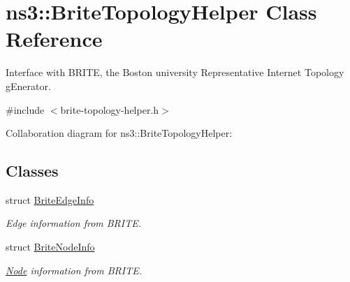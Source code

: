 \hypertarget{classns3_1_1BriteTopologyHelper}{}\section{ns3\+:\+:Brite\+Topology\+Helper Class Reference}
\label{classns3_1_1BriteTopologyHelper}


Interface with B\+R\+I\+TE, the Boston university Representative Internet Topology g\+Enerator.  




{\ttfamily \#include $<$brite-\/topology-\/helper.\+h$>$}



Collaboration diagram for ns3\+:\+:Brite\+Topology\+Helper\+:
\subsection*{Classes}
\begin{DoxyCompactItemize}
\item 
struct \hyperlink{structns3_1_1BriteTopologyHelper_1_1BriteEdgeInfo}{Brite\+Edge\+Info}
\begin{DoxyCompactList}\small\item\em Edge information from B\+R\+I\+TE. \end{DoxyCompactList}\item 
struct \hyperlink{structns3_1_1BriteTopologyHelper_1_1BriteNodeInfo}{Brite\+Node\+Info}
\begin{DoxyCompactList}\small\item\em \hyperlink{classns3_1_1Node}{Node} information from B\+R\+I\+TE. \end{DoxyCompactList}\end{DoxyCompactItemize}
